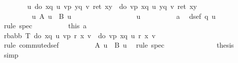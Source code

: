 \begin{isabellebody}
\ \ \ \ \ \ \isamarkupfalse%
\ {\isachardoublequote}{\isasymforall}u{\isachardot}\ do\ {\isacharbraceleft}x{\isasymleftarrow}q\ u{\isacharsemicolon}\ v{\isasymleftarrow}p{\isacharsemicolon}\ y{\isasymleftarrow}q\ v{\isacharsemicolon}\ ret\ {\isacharparenleft}x{\isacharcomma}y{\isacharparenright}{\isacharbraceright}\ {\isacharequal}\ do\ {\isacharbraceleft}v{\isasymleftarrow}p{\isacharsemicolon}\ x{\isasymleftarrow}q\ u{\isacharsemicolon}\ y{\isasymleftarrow}q\ v{\isacharsemicolon}\ ret\ {\isacharparenleft}x{\isacharcomma}y{\isacharparenright}{\isacharbraceright}{\isachardoublequote}\isanewline
\ \ \ \ \ \ \ \ {\isacharparenleft}\ {\isachardoublequote}{\isasymforall}u{\isachardot}\ {\isacharquery}A\ u\ {\isacharequal}\ {\isacharquery}B\ u{\isachardoublequote}{\isacharparenright}\isanewline
\ \ \ \ \ \ \isamarkupfalse%
\ \isanewline
\ \ \ \ \ \ \ \ \isamarkupfalse%
\ u\isanewline
\ \ \ \ \ \ \ \ \isamarkupfalse%
\ a{}\ \isamarkupfalse%
\ {\isachardoublequote}dsef\ {\isacharparenleft}q\ u{\isacharparenright}{\isachardoublequote}\ \isamarkupfalse%
\ {\isacharparenleft}rule\ spec{\isacharparenright}\isanewline
\ \ \ \ \ \ \ \ \isamarkupfalse%
\ this\ a{}\ \isanewline
\ \ \ \ \ \ \ \ \isamarkupfalse%
\ {\isachardoublequote}{\isasymforall}r{\isacharcolon}{\isacharcolon}{\isacharprime}b{\isasymRightarrow}{\isacharprime}a{\isasymRightarrow}{\isacharparenleft}{\isacharprime}b{\isacharasterisk}{\isacharprime}b{\isacharparenright}\ T{\isachardot}\ do\ {\isacharbraceleft}x{\isasymleftarrow}q\ u{\isacharsemicolon}\ v{\isasymleftarrow}p{\isacharsemicolon}\ r\ x\ v{\isacharbraceright}\ {\isacharequal}\ do\ {\isacharbraceleft}v{\isasymleftarrow}p{\isacharsemicolon}\ x{\isasymleftarrow}q\ u{\isacharsemicolon}\ r\ x\ v{\isacharbraceright}{\isachardoublequote}\isanewline
\ \ \ \ \ \ \ \ \ \ \isamarkupfalse%
\ {\isacharparenleft}rule\ commute{\isacharunderscore}dsef{\isacharparenright}\isanewline
\ \ \ \ \ \ \ \ \isamarkupfalse%
\ {\isachardoublequote}{\isacharquery}A\ u\ {\isacharequal}\ {\isacharquery}B\ u{\isachardoublequote}\ \isamarkupfalse%
\ {\isacharparenleft}rule\ spec{\isacharparenright}\isanewline
\ \ \ \ \ \ \isamarkupfalse%
\isanewline
\ \ \ \ \ \ \isamarkupfalse%
\ {\isacharquery}thesis\ \isamarkupfalse%
\ simp\isanewline
\ \ \ \ \isamarkupfalse%
\isanewline
\ \ \ \ \isamarkupfalse%

\end{isabellebody}
